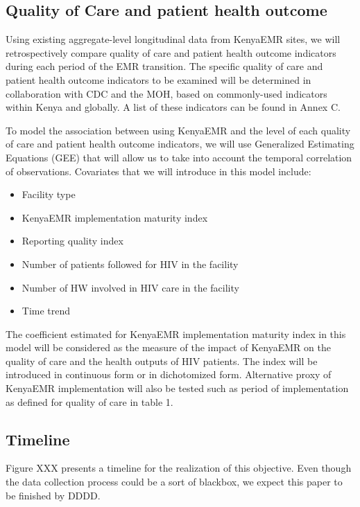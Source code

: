 \documentclass[a4paper,11pt,final,twoside]{article}
\begin{document}
\subsection{Quality of Care and patient health outcome}

Using existing aggregate-level longitudinal data from KenyaEMR sites, we will retrospectively compare quality of care and patient health outcome indicators during each period of the EMR transition. The specific quality of care and patient health outcome indicators to be examined will be determined in collaboration with CDC and the MOH, based on commonly-used indicators within Kenya and globally. A list of these indicators can be found in Annex C.

To model the association between using KenyaEMR and the level of each quality of care and patient health outcome indicators, we will use Generalized Estimating Equations (GEE) that will allow us to take into account the temporal correlation of observations. Covariates that we will introduce in this model include:
\begin{itemize}
\item	Facility type
\item	KenyaEMR implementation maturity index
\item	Reporting quality index
\item	Number of patients followed for HIV in the facility
\item	Number of HW involved in HIV care in the facility
\item	Time trend
\end{itemize}
The coefficient estimated for KenyaEMR implementation maturity index in this model will be considered as the measure of the impact of KenyaEMR on the quality of care and the health outputs of HIV patients. The index will be introduced in continuous form or in dichotomized form. Alternative proxy of KenyaEMR implementation will also be tested such as period of implementation as defined for quality of care in table 1.

\subsection{Timeline} Figure XXX presents a timeline for the realization of this objective. Even though the data collection process could be a sort of blackbox, we expect this paper to be finished by DDDD.
\end{document}
